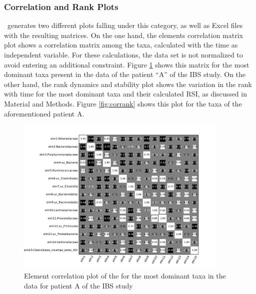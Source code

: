 \subsubsection*{Correlation and Rank Plots} 
\CC\ generates two different plots falling under this category, as well as Excel files with the resulting matrices. On the one hand, the elements correlation matrix plot shows a correlation matrix among the taxa, calculated with the time as independent variable. For these calculations, the data set is not normalized to avoid entering an additional constraint. Figure \ref{fig:corrElm} shows this matrix for the most dominant taxa present in the data of the patient ``A'' of the IBS study\cite{IBS}. On the other hand, the rank dynamics and stability plot shows the variation in the rank with time for the most dominant taxa and their calculated RSI, as discussed in Material and Methods. Figure \ref{fig:corrank} shows this plot for the taxa of the aforementioned patient A.

\begin{figure}
	\centering
	\includegraphics[width=0.9\textwidth]{results/corrank/IBS_h_A_amplicons_family_ElmCorrelation.pdf}
	\caption{Element correlation plot of the for the most dominant taxa in the data for patient A of the IBS study\cite{IBS}}
	\label{fig:corrElm}
\end{figure}

